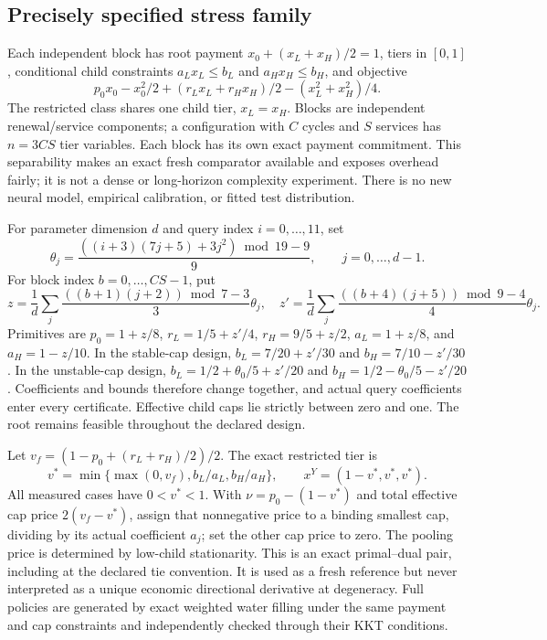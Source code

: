 \subsection{Precisely specified stress family}
Each independent block has root payment $x_0+(x_L+x_H)/2=1$, tiers in $[0,1]$, conditional child constraints $a_Lx_L\leq b_L$ and $a_Hx_H\leq b_H$, and objective
\[
 p_0x_0-x_0^2/2+(r_Lx_L+r_Hx_H)/2-(x_L^2+x_H^2)/4.
\]
The restricted class shares one child tier, $x_L=x_H$. Blocks are independent renewal/service components; a configuration with $C$ cycles and $S$ services has $n=3CS$ tier variables. Each block has its own exact payment commitment. This separability makes an exact fresh comparator available and exposes overhead fairly; it is not a dense or long-horizon complexity experiment. There is no new neural model, empirical calibration, or fitted test distribution.

For parameter dimension $d$ and query index $i=0,\ldots,11$, set
\[
 \theta_j=\frac{((i+3)(7j+5)+3j^2)\bmod19-9}{9},\qquad j=0,\ldots,d-1.
\]
For block index $b=0,\ldots,CS-1$, put
\[
 z=\frac1d\sum_j\frac{((b+1)(j+2))\bmod7-3}{3}\theta_j,
 \quad
 z'=\frac1d\sum_j\frac{((b+4)(j+5))\bmod9-4}{4}\theta_j.
\]
Primitives are $p_0=1+z/8$, $r_L=1/5+z'/4$, $r_H=9/5+z/2$, $a_L=1+z/8$, and $a_H=1-z/10$. In the stable-cap design, $b_L=7/20+z'/30$ and $b_H=7/10-z'/30$. In the unstable-cap design, $b_L=1/2+\theta_0/5+z'/20$ and $b_H=1/2-\theta_0/5-z'/20$. Coefficients and bounds therefore change together, and actual query coefficients enter every certificate. Effective child caps lie strictly between zero and one. The root remains feasible throughout the declared design.

Let $v_f=(1-p_0+(r_L+r_H)/2)/2$. The exact restricted tier is
\[
 v^*=\min\{\max(0,v_f),b_L/a_L,b_H/a_H\},\qquad
 x^Y=(1-v^*,v^*,v^*).
\]
All measured cases have $0<v^*<1$. With $\nu=p_0-(1-v^*)$ and total effective cap price $2(v_f-v^*)$, assign that nonnegative price to a binding smallest cap, dividing by its actual coefficient $a_j$; set the other cap price to zero. The pooling price is determined by low-child stationarity. This is an exact primal--dual pair, including at the declared tie convention. It is used as a fresh reference but never interpreted as a unique economic directional derivative at degeneracy. Full policies are generated by exact weighted water filling under the same payment and cap constraints and independently checked through their KKT conditions.

